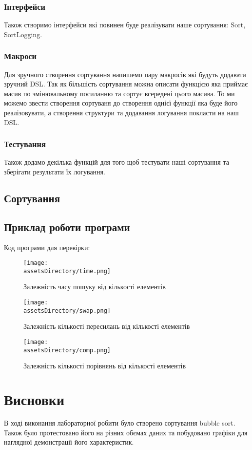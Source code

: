\subsubsection{Інтерфейси}
Також створимо інтерфейси які повинен буде реалізувати наше сортування: Sort, SortLogging.


\subsubsection{Макроси}
Для зручного створення сортування напишемо пару макросів які будуть додавати зручний DSL.
Так як більшість сортування можна описати функцією яка приймає масив по змінювальному посиланню та сортує всередені цього масива.
То ми можемо звести створення сортуваня до створення однієї функції яка буде його реалізовувати,
а створення структури та додавання логування покласти на наш DSL.


\subsubsection{Тестування}
Також додамо декілька функцій для того щоб тестувати наші сортування та зберігати результати їх логування.



\newpage
\subsection{Сортування}



\newpage
\subsection{Приклад роботи програми}
\noindent
Код програми для перевірки:



\begin{figure}[ht!]
    \centering
    \texttt{[image: \\assetsDirectory/time.png]}
    \caption{Залежність часу пошуку від кількості елементів}
\end{figure}
\begin{figure}[ht!]
    \centering
    \texttt{[image: \\assetsDirectory/swap.png]}
    \caption{Залежність кількості пересилань від кількості елементів}
\end{figure}
\begin{figure}[ht!]
    \centering
    \texttt{[image: \\assetsDirectory/comp.png]}
    \caption{Залежність кількості порівнянь від кількості елементів}
\end{figure}


\newpage
\section{Висновки}
В ході виконання лабораторної робити було створено сортування bubble sort.
Також було протестовано його на різних обємах даних та побудовано графіки для наглядної демонстрації його характеристик.
